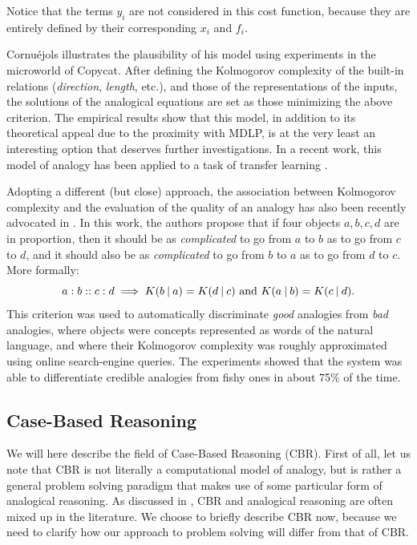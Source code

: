 Notice that the terms $y_i$ are not considered in this cost function, because
they are entirely defined by their corresponding $x_i$ and $f_i$.

Cornuéjols illustrates the plausibility of his model using experiments in the
microworld of Copycat. After defining the Kolmogorov complexity of the built-in
relations (\textit{direction}, \textit{length}, etc.), and those of the
representations of the inputs, the solutions of the analogical equations are
set as those minimizing the above criterion. The empirical results show that
this model, in addition to its theoretical appeal due to the proximity with
MDLP, is at the very least an interesting option that deserves further
investigations. In a recent work, this model of analogy has been applied to a
task of transfer learning \cite{CorMur16}.

Adopting a different (but close) approach, the association between Kolmogorov
complexity and the evaluation of the quality of an analogy has also been
recently advocated in \cite{BayPraRic12}. In this work, the authors propose
that if four objects $a, b, c, d$ are in proportion, then it should be as
\textit{complicated} to go from $a$ to $b$ as to go from $c$ to $d$, and it
should also be as \textit{complicated} to go from $b$ to $a$ as to go from $d$
to $c$. More formally:
$$a:b::c:d \implies K(b \:\vert\: a) = K(d \:\vert\: c) \text{ and } K(a \:\vert\: b) =
K(c \:\vert\: d).$$
This criterion was used to automatically discriminate \textit{good} analogies
from \textit{bad} analogies, where objects were concepts represented as words
of the natural language, and where their Kolmogorov complexity was roughly
approximated using online search-engine queries. The experiments showed that
the system was able to differentiate credible analogies from fishy ones in
about 75\% of the time.

\subsection{Case-Based Reasoning}

We will here describe the field of Case-Based Reasoning (CBR). First of all,
let us note that CBR is not literally a computational model of analogy, but is
rather a general problem solving paradigm that makes use of some particular
form of analogical reasoning. As discussed in \cite{AamPla94}, CBR and
analogical reasoning are often mixed up in the literature.  We choose to
briefly describe CBR now, because we need to clarify how our approach to
problem solving will differ from that of CBR.

